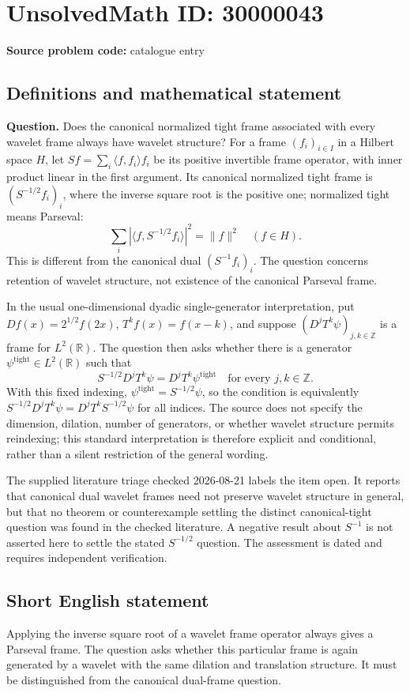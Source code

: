 \documentclass[11pt]{article}
\newcommand{\Z}{\mathbb{Z}}
\newcommand{\R}{\mathbb{R}}
\begin{document}
\section*{UnsolvedMath ID: 30000043}
\textbf{Source problem code:} catalogue entry
\subsection{Definitions and mathematical statement}
\textbf{Question.} Does the canonical normalized tight frame associated with every wavelet frame always have wavelet structure? For a frame \((f_i)_{i\in I}\) in a Hilbert space \(H\), let \(Sf=\sum_i\langle f,f_i\rangle f_i\) be its positive invertible frame operator, with inner product linear in the first argument. Its canonical normalized tight frame is \((S^{-1/2}f_i)_i\), where the inverse square root is the positive one; normalized tight means Parseval:\[\sum_i|\langle f,S^{-1/2}f_i\rangle|^2=\|f\|^2\quad(f\in H).\] This is different from the canonical dual \((S^{-1}f_i)_i\). The question concerns retention of wavelet structure, not existence of the canonical Parseval frame.\par In the usual one-dimensional dyadic single-generator interpretation, put \(D f(x)=2^{1/2}f(2x)\), \(T^k f(x)=f(x-k)\), and suppose \((D^jT^k\psi)_{j,k\in\Z}\) is a frame for \(L^2(\R)\). The question then asks whether there is a generator \(\psi^{\mathrm{tight}}\in L^2(\R)\) such that\[S^{-1/2}D^jT^k\psi=D^jT^k\psi^{\mathrm{tight}}\quad\text{for every }j,k\in\Z.\] With this fixed indexing, \(\psi^{\mathrm{tight}}=S^{-1/2}\psi\), so the condition is equivalently \(S^{-1/2}D^jT^k\psi=D^jT^kS^{-1/2}\psi\) for all indices. The source does not specify the dimension, dilation, number of generators, or whether wavelet structure permits reindexing; this standard interpretation is therefore explicit and conditional, rather than a silent restriction of the general wording.\par The supplied literature triage checked 2026-08-21 labels the item open. It reports that canonical dual wavelet frames need not preserve wavelet structure in general, but that no theorem or counterexample settling the distinct canonical-tight question was found in the checked literature. A negative result about \(S^{-1}\) is not asserted here to settle the stated \(S^{-1/2}\) question. The assessment is dated and requires independent verification.
\subsection{Short English statement}
Applying the inverse square root of a wavelet frame operator always gives a Parseval frame. The question asks whether this particular frame is again generated by a wavelet with the same dilation and translation structure. It must be distinguished from the canonical dual-frame question.
\end{document}
